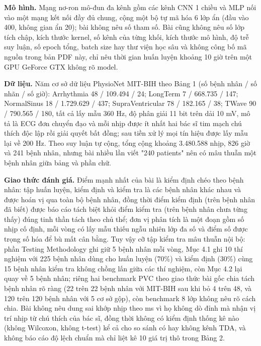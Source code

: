 \documentclass[12pt,a4paper]{article}
\begin{document}
\noindent \textbf{Mô hình.} Mạng nơ-ron mô-đun đa kênh gồm các kênh CNN 1 chiều và MLP nối vào một mạng kết nối đầy đủ chung, cộng một bộ tự mã hóa 6 lớp ẩn (đầu vào 400, không gian ẩn 20); bài không nêu số tham số. Bài cũng không nêu số lớp tích chập, kích thước kernel, số kênh của từng khối, kích thước mô hình, độ trễ suy luận, số epoch tổng, batch size hay thư viện học sâu và không công bố mã nguồn trong bản PDF này, chỉ nêu thời gian huấn luyện khoảng 10 giờ trên một GPU GeForce GTX không rõ model.\par\vspace{3pt}
\noindent \textbf{Dữ liệu.} Năm cơ sở dữ liệu PhysioNet MIT-BIH theo Bảng 1 (số bệnh nhân / số nhãn / số giờ): Arrhythmia 48 / 109.494 / 24; LongTerm 7 / 668.735 / 147; NormalSinus 18 / 1.729.629 / 437; SupraVentricular 78 / 182.165 / 38; TWave 90 / 790.565 / 180, tất cả lấy mẫu 360 Hz, độ phân giải 11 bit trên dải 10 mV, mô tả là ECG đơn chuyển đạo và mỗi nhịp được ít nhất hai bác sĩ tim mạch chú thích độc lập rồi giải quyết bất đồng; sau tiền xử lý mọi tín hiệu được lấy mẫu lại về 200 Hz. Theo suy luận tự cộng, tổng cộng khoảng 3.480.588 nhịp, 826 giờ và 241 bệnh nhân, nhưng bài nhiều lần viết "240 patients" nên có mâu thuẫn một bệnh nhân giữa bảng và phần chữ.\par\vspace{3pt}
\noindent \textbf{Giao thức đánh giá.} Điểm mạnh nhất của bài là kiểm định chéo theo bệnh nhân: tập huấn luyện, kiểm định và kiểm tra là các bệnh nhân khác nhau và được hoán vị qua toàn bộ bệnh nhân, đồng thời điểm kiểm định (trên bệnh nhân đã biết) được báo cáo tách biệt khỏi điểm kiểm tra (trên bệnh nhân chưa từng thấy) đúng tinh thần tách theo chủ thể; đơn vị phân tích là một đoạn gồm số nhịp cố định, mỗi vòng có lấy mẫu thiếu ngẫu nhiên lớp đa số và điểm số được trọng số hóa để bù mất cân bằng. Tuy vậy cỡ tập kiểm tra mâu thuẫn nội bộ: phần Testing Methodology ghi giữ 5 bệnh nhân mỗi vòng, Mục 4.1 ghi 10 thí nghiệm với 225 bệnh nhân dùng cho huấn luyện (70\%) và kiểm định (30\%) cùng 15 bệnh nhân kiểm tra không chồng lấn giữa các thí nghiệm, còn Mục 4.2 lại quay về 5 bệnh nhân; riêng hai benchmark PVC theo giao thức bài gốc chia tách bệnh nhân rõ ràng (22 trên 22 bệnh nhân với MIT-BIH sau khi bỏ 4 trên 48, và 120 trên 120 bệnh nhân với 5 cơ sở gộp), còn benchmark 8 lớp không nêu rõ cách chia. Bài không nêu dung sai khớp nhịp theo ms vì họ không dò đỉnh mà nhận vị trí nhịp từ chú thích của bác sĩ, đồng thời không có kiểm định thống kê nào (không Wilcoxon, không t-test) kể cả cho so sánh có hay không kênh TDA, và không báo cáo độ lệch chuẩn mà chỉ liệt kê 10 giá trị thô trong Bảng 2.\par\vspace{3pt}
\end{document}
